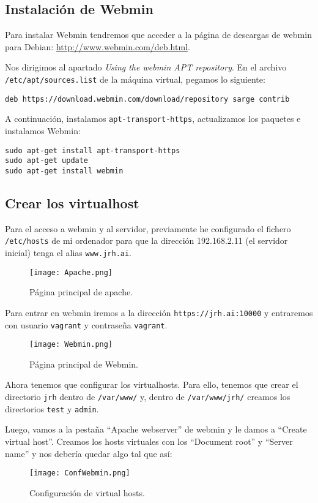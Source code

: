 \documentclass[12pt,letterpaper]{article}
\begin{document}
\subsection{Instalación de Webmin}
Para instalar Webmin tendremos que acceder a la página de descargas de webmin para Debian: \url{http://www.webmin.com/deb.html}.

Nos dirigimos al apartado \textit{Using the webmin APT repository}. En el archivo \texttt{/etc/apt/sources.list}
de la máquina virtual, pegamos lo siguiente:
\begin{center}
	\texttt{deb https://download.webmin.com/download/repository sarge contrib}
\end{center}

A continuación, instalamos \texttt{apt-transport-https}, actualizamos los paquetes e instalamos Webmin:
\begin{center}
	\texttt{sudo apt-get install apt-transport-https\\sudo apt-get update\\sudo apt-get install webmin}
\end{center}

\subsection{Crear los virtualhost}
Para el acceso a webmin y al servidor, previamente he configurado el fichero \texttt{/etc/hosts} de mi ordenador para que la dirección 192.168.2.11 (el servidor inicial) tenga el alias \texttt{www.jrh.ai}.
\newpage
\begin{figure}[h]
	\centering
	\texttt{[image: Apache.png]}
	\caption{Página principal de apache.}
	\label{Pagina principal de apache}
\end{figure}

Para entrar en webmin iremos a la dirección \texttt{https://jrh.ai:10000} y entraremos con usuario \texttt{vagrant} y contraseña \texttt{vagrant}.
\begin{figure}[h]
	\centering
	\texttt{[image: Webmin.png]}
	\caption{Página principal de Webmin.}
	\label{Pagina principal de Webmin}
\end{figure}

Ahora tenemos que configurar los virtualhosts. Para ello, tenemos que crear el directorio \texttt{jrh} dentro de \texttt{/var/www/} y, dentro de \texttt{/var/www/jrh/} creamos los directorios \texttt{test} y \texttt{admin}.


Luego, vamos a la pestaña ``Apache webserver'' de webmin y le damos a ``Create virtual host''. Creamos los hosts virtuales con los ``Document root'' y ``Server name'' y nos debería quedar algo tal que así:
\newpage
\begin{figure}[h]
	\centering
	\texttt{[image: ConfWebmin.png]}
	\caption{Configuración de virtual hosts.}
	\label{Configuracion de virtual hosts}
\end{figure}
\end{document}
